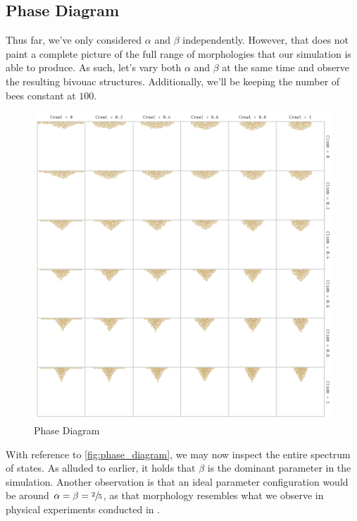 \documentclass[a4paper,10pt]{article}
\begin{document}
\begin{multicols}{2}
    \subsection{Phase Diagram}

    Thus far, we've only considered $\alpha$ and $\beta$ independently. However, that does not
    paint a complete picture of the full range of morphologies that our simulation
    is able to produce. As such, let's vary both $\alpha$ and $\beta$ at the same
    time and observe the resulting bivouac structures. Additionally, we'll be keeping
    the number of bees constant at $100$.

    \begin{figure}[H]
        \centering
        \includegraphics[width=\linewidth]{phase_diagram.pdf}
        \caption{Phase Diagram}
        \label{fig:phase_diagram}
    \end{figure}

    With reference to \autoref{fig:phase_diagram}, we may now inspect the entire spectrum of
    states. As alluded to earlier, it holds that $\beta$ is the dominant parameter in the
    simulation. Another observation is that an ideal parameter configuration would be
    around $\alpha = \beta = \sfrac{2}{5}$, as that morphology resembles what we observe in
    physical experiments conducted in \cite{peleg2018collective}.


\end{multicols}
\end{document}
